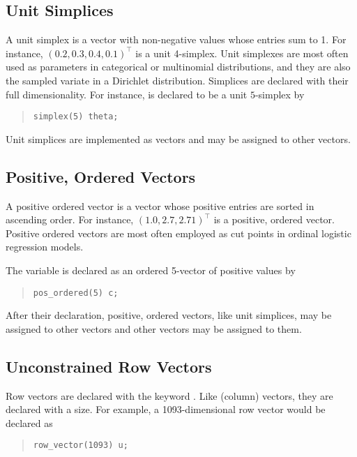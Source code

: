 \subsection{Unit Simplices}

A unit simplex is a vector with non-negative values whose entries sum
to 1.  For instance, $(0.2,0.3,0.4,0.1)^{\top}$ is a unit 4-simplex.
Unit simplexes are most often used as parameters in categorical
or multinomial distributions, and they are also the sampled variate in
a Dirichlet distribution.  Simplices are declared with their full
dimensionality.  For instance,  is declared to
be a unit $5$-simplex by
%
\begin{quote}
\begin{Verbatim} 
simplex(5) theta;
\end{Verbatim}
\end{quote}
% 

Unit simplices are implemented as vectors and may be assigned to other
vectors.  


\subsection{Positive, Ordered Vectors}

A positive ordered vector is a vector whose positive entries are
sorted in ascending order.  For instance, $(1.0,2.7,2.71)^{\top}$ is a
positive, ordered vector.  Positive ordered vectors are most often
employed as cut points in ordinal logistic regression models.  

The variable  is declared as an ordered 5-vector of positive
values by
%
\begin{quote}
\begin{Verbatim}
pos_ordered(5) c;
\end{Verbatim}
\end{quote}
%

After their declaration, positive, ordered vectors, like unit
simplices, may be assigned to other vectors and other vectors may be
assigned to them.  

\subsection{Unconstrained Row Vectors}

Row vectors are declared with the keyword .
Like (column) vectors, they are declared with a size.  For example,
a 1093-dimensional row vector  would be declared as
%
\begin{quote}
\begin{Verbatim}
row_vector(1093) u;
\end{Verbatim}
\end{quote}
%

